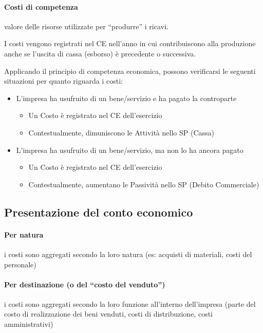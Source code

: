 \paragraph{Costi di competenza}
valore delle risorse utilizzate per ``produrre'' i ricavi.

I costi vengono registrati nel CE nell’anno in cui contribuiscono alla
produzione anche se l’uscita di cassa (esborso) è precedente o
successiva.

Applicando il principio di competenza economica, possono verificarsi le
seguenti situazioni per quanto riguarda i costi:
\begin{itemize}
    \item L’impresa ha usufruito di un bene/servizio e ha pagato la controparte
    \begin{itemize}
        \item Un Costo è registrato nel CE dell’esercizio
        \item Contestualmente, dimuniscono le Attività nello SP (Cassa)
    \end{itemize}
    \item L’impresa ha usufruito di un bene/servizio, ma non lo ha ancora pagato
    \begin{itemize}
        \item Un Costo è registrato nel CE dell’esercizio
        \item Contestualmente, aumentano le Passività nello SP (Debito Commerciale)
    \end{itemize}
\end{itemize}

\subsection{Presentazione del conto economico}

\paragraph{Per natura}
i costi sono aggregati secondo la loro natura (es: acquisti di
materiali, costi del personale)

\paragraph{Per destinazione (o del ``costo del venduto'')}
i costi sono aggregati secondo la loro funzione all’interno dell’impresa (parte del costo di
realizzazione dei beni venduti, costi di distribuzione, costi amministrativi)

